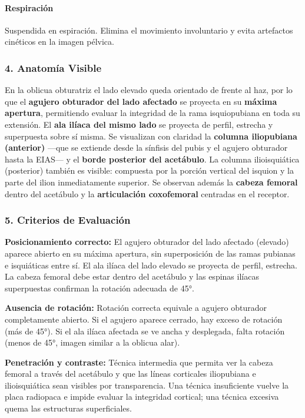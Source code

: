 	\paragraph{Respiración}
	Suspendida en espiración. Elimina el movimiento involuntario y evita artefactos cinéticos en la imagen pélvica.
	
	\subsubsection*{4. Anatomía Visible}
	
	En la oblicua obturatriz el lado elevado queda orientado de frente al haz, por lo que el \textbf{agujero obturador del lado afectado} se proyecta en su \textbf{máxima apertura}, permitiendo evaluar la integridad de la rama isquiopubiana en toda su extensión. El \textbf{ala ilíaca del mismo lado} se proyecta de perfil, estrecha y superpuesta sobre sí misma. Se visualizan con claridad la \textbf{columna iliopubiana (anterior)} —que se extiende desde la sínfisis del pubis y el agujero obturador hasta la EIAS— y el \textbf{borde posterior del acetábulo}. La columna ilioisquiática (posterior) también es visible: compuesta por la porción vertical del isquion y la parte del ilion inmediatamente superior. Se observan además la \textbf{cabeza femoral} dentro del acetábulo y la \textbf{articulación coxofemoral} centradas en el receptor.
	
	\subsubsection*{5. Criterios de Evaluación}
	
	\textbf{Posicionamiento correcto:} El agujero obturador del lado afectado (elevado) aparece abierto en su máxima apertura, sin superposición de las ramas pubianas e isquiáticas entre sí. El ala ilíaca del lado elevado se proyecta de perfil, estrecha. La cabeza femoral debe estar dentro del acetábulo y las espinas ilíacas superpuestas confirman la rotación adecuada de 45°.
	
	\textbf{Ausencia de rotación:} Rotación correcta equivale a agujero obturador completamente abierto. Si el agujero aparece cerrado, hay exceso de rotación (más de 45°). Si el ala ilíaca afectada se ve ancha y desplegada, falta rotación (menos de 45°, imagen similar a la oblicua alar).
	
	\textbf{Penetración y contraste:} Técnica intermedia que permita ver la cabeza femoral a través del acetábulo y que las líneas corticales iliopubiana e ilioisquiática sean visibles por transparencia. Una técnica insuficiente vuelve la placa radiopaca e impide evaluar la integridad cortical; una técnica excesiva quema las estructuras superficiales.
	
